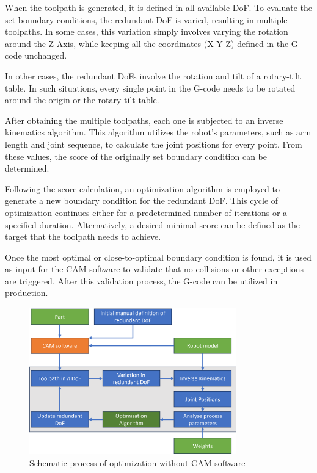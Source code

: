 When the toolpath is generated, it is defined in all available DoF. To evaluate the set boundary conditions, the redundant DoF is varied, resulting in multiple toolpaths. In some cases, this variation simply involves varying the rotation around the Z-Axis, while keeping all the coordinates (X-Y-Z) defined in the G-code unchanged.

In other cases, the redundant DoFs involve the rotation and tilt of a rotary-tilt table. In such situations, every single point in the G-code needs to be rotated around the origin or the rotary-tilt table.

After obtaining the multiple toolpaths, each one is subjected to an inverse kinematics algorithm. This algorithm utilizes the robot's parameters, such as arm length and joint sequence, to calculate the joint positions for every point. From these values, the score of the originally set boundary condition can be determined.

Following the score calculation, an optimization algorithm is employed to generate a new boundary condition for the redundant DoF. This cycle of optimization continues either for a predetermined number of iterations or a specified duration. Alternatively, a desired minimal score can be defined as the target that the toolpath needs to achieve.
 

Once the most optimal or close-to-optimal boundary condition is found, it is used as input for the CAM software to validate that no collisions or other exceptions are triggered. After this validation process, the G-code can be utilized in production.

\begin{figure}[H]
	\centerline{\includegraphics[width=0.8\textwidth]{figures/nocam.png}}
	\caption{Schematic process of optimization without CAM software}
	\label{nocam}
\end{figure}

